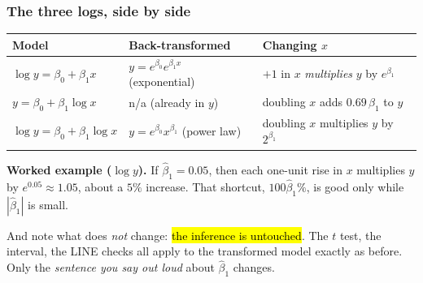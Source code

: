 \documentclass[slidestop,compress,mathserif]{beamer}
\begin{document}
\begin{frame}
\frametitle{The three logs, side by side}

{\footnotesize
\begin{center}
\setlength{\tabcolsep}{4pt}
\renewcommand{\arraystretch}{1.4}
\begin{tabular}{@{}lll@{}}
\toprule
\textbf{Model} & \textbf{Back-transformed} & \textbf{Changing $x$} \\
\midrule
$\log y = \beta_0 + \beta_1 x$ & $y = e^{\beta_0}e^{\beta_1 x}$ (exponential) & $+1$ in $x$ \emph{multiplies} $y$ by $e^{\beta_1}$ \\
$y = \beta_0 + \beta_1 \log x$ & n/a (already in $y$) & doubling $x$ adds $0.69\,\beta_1$ to $y$ \\
$\log y = \beta_0 + \beta_1 \log x$ & $y = e^{\beta_0} x^{\beta_1}$ (power law) & doubling $x$ multiplies $y$ by $2^{\beta_1}$ \\
\bottomrule
\end{tabular}
\end{center}}

\pause
\vspace{0.2em}
{\small \textbf{Worked example ($\log y$).} If $\hat\beta_1 = 0.05$, then each one-unit rise in $x$ multiplies $y$ by $e^{0.05} \approx 1.05$, about a $5\%$ increase. That shortcut, $100\hat\beta_1\%$, is good only while $|\hat\beta_1|$ is small.}

\pause
\vspace{0.2em}
{\small And note what does \emph{not} change: \hl{the inference is untouched}. The $t$ test, the interval, the LINE checks all apply to the transformed model exactly as before. Only the \emph{sentence you say out loud} about $\hat\beta_1$ changes.}

\end{frame}
\end{document}
